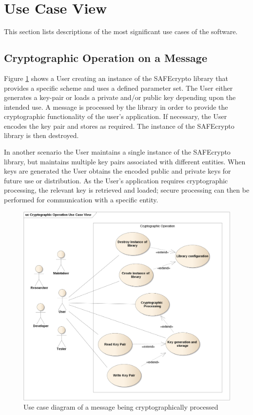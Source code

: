 \section{Use Case View}
\label{sec_use_case}

This section lists descriptions of the most significant use cases of the software.

\subsection{Cryptographic Operation on a Message}

Figure \ref{fig:use_case_1} shows a User creating an instance of the SAFEcrypto library that provides a specific scheme and uses a defined parameter set. The User either generates a key-pair or loads a private and/or public key depending upon the intended use. A message is processed by the library in order to provide the cryptographic functionality of the user's application. If necessary, the User encodes the key pair and stores as required. The instance of the SAFEcrypto library is then destroyed.

In another scenario the User maintains a single instance of the SAFEcrypto library, but maintains multiple key pairs associated with different entities. When keys are generated the User obtains the encoded public and private keys for future use or distribution. As the User's application requires cryptographic processing, the relevant key is retrieved and loaded; secure processing can then be performed for communication with a specific entity.

\begin{figure}[H]
\centering
\includegraphics[width=14cm]{cryptographic_operation_use_case_view.png}
\caption{Use case diagram of a message being cryptographically processed}
\label{fig:use_case_1}
\end{figure}


